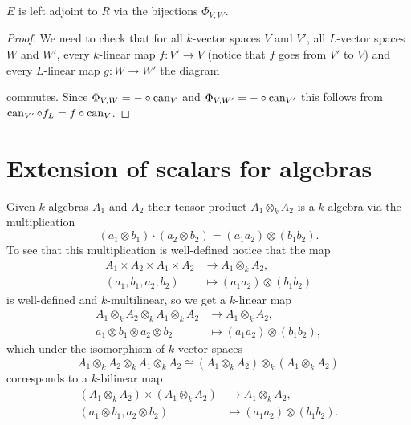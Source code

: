 \begin{prop}
 $E$ is left adjoint to $R$ via the bijections $\Phi_{V,W}$.
\end{prop}
\begin{proof}
 We need to check that for all $k$-vector spaces $V$ and $V'$, all $L$-vector spaces $W$ and $W'$, every $k$-linear map $f \colon V' \to V$ (notice that $f$ goes from $V'$ to $V$) and every $L$-linear map $g \colon W \to W'$ the diagram
 \begin{center}
 \end{center}
 commutes. Since $\Phi_{V,W} = - \circ \operatorname{can}_V$ and $\Phi_{V,W'} = - \circ \operatorname{can}_{V'}$ this follows from $\operatorname{can}_{V'} \circ f_L = f \circ \operatorname{can}_V$.
\end{proof}





\section{Extension of scalars for algebras}


Given $k$-algebras $A_1$ and $A_2$ their tensor product $A_1 \otimes_k A_2$ is a $k$-algebra via the multiplication
\[
 (a_1 \otimes b_1) \cdot (a_2 \otimes b_2) = (a_1 a_2) \otimes (b_1 b_2).
\]
To see that this multiplication is well-defined notice that the map
\begin{align*}
 A_1 \times A_2 \times A_1 \times A_2 &\to A_1 \otimes_k A_2, \\
 (a_1, b_1, a_2, b_2) &\mapsto (a_1 a_2) \otimes (b_1 b_2)
\end{align*}
is well-defined and $k$-multilinear, so we get a $k$-linear map
\begin{align*}
 A_1 \otimes_k A_2 \otimes_k A_1 \otimes_k A_2 &\to A_1 \otimes_k A_2, \\
 a_1 \otimes b_1 \otimes a_2 \otimes b_2 &\mapsto (a_1 a_2) \otimes (b_1 b_2),
\end{align*}
which under the isomorphism of $k$-vector spaces
\[
 A_1 \otimes_k A_2 \otimes_k A_1 \otimes_k A_2 \cong (A_1 \otimes_k A_2) \otimes_k (A_1 \otimes_k A_2)
\]
corresponds to a $k$-bilinear map
\begin{align*}
 (A_1 \otimes_k A_2) \times (A_1 \otimes_k A_2) &\to A_1 \otimes_k A_2, \\
 (a_1 \otimes b_1, a_2 \otimes b_2) &\mapsto (a_1 a_2) \otimes (b_1 b_2).
\end{align*}

